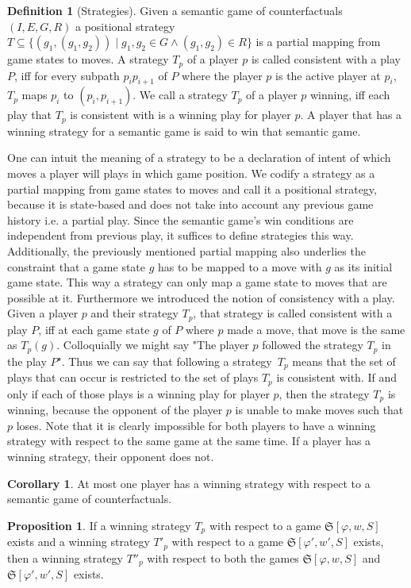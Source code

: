 \documentclass[a4paper,american,10pt]{paper}
\theoremstyle{definition}\newtheorem{lemma}[thm]{Lemma}
\theoremstyle{definition}\newtheorem{proposition}[thm]{Proposition}
\theoremstyle{definition}\newtheorem{corollary}[thm]{Corollary}
\theoremstyle{definition}\newtheorem{definition}{Definition}
\begin{document}
\begin{definition}[Strategies]
Given a semantic game of counterfactuals $(I, E, G, R)$ a positional strategy $T\subseteq\{(g_1,(g_1,g_2))\mid g_1,g_2\in G\wedge (g_1,g_2)\in R\}$ is a partial mapping from game states to moves. A strategy $T_p$ of a player $p$ is called consistent with a play $P$, iff for every subpath $p_ip_{i+1}$ of $P$ where the player $p$ is the active player at $p_i$, $T_p$ maps $p_i$ to $(p_i,p_{i+1})$. We call a strategy $T_p$ of a player $p$ winning, iff each play that $T_p$ is consistent with is a winning play for player $p$. A player that has a winning strategy for a semantic game is said to win that semantic game.
\end{definition}
One can intuit the meaning of a strategy to be a declaration of intent of which moves a player will plays in which game position. We codify a strategy as a partial mapping from game states to moves and call it a positional strategy, because it is state-based and does not take into account any previous game history i.e. a partial play. Since the semantic game's win conditions are independent from previous play, it suffices to define strategies this way. Additionally, the previously mentioned partial mapping also underlies the constraint that a game state $g$ has to be mapped to a move with $g$ as its initial game state. This way a strategy can only map a game state to moves that are possible at it. Furthermore we introduced the notion of consistency with a play. Given a player $p$ and their strategy $T_p$, that strategy is called consistent with a play $P$, iff at each game state $g$ of $P$ where $p$ made a move, that move is the same as $T_p(g)$.
Colloquially we might say "The player $p$ followed the strategy $T_p$ in the play $P$". Thus we can say that following a strategy~$T_p$ means that the set of plays that can occur is restricted to the set of plays $T_p$ is consistent with. If and only if each of those plays is a winning play for player $p$, then the strategy $T_p$ is winning, because the opponent of the player $p$ is unable to make moves such that $p$ loses. Note that it is clearly impossible for both players to have a winning strategy with respect to the same game at the same time. If a player has a winning strategy, their opponent does not.
\begin{corollary}
At most one player has a winning strategy with respect to a semantic game of counterfactuals.
\end{corollary}
\begin{proposition}\label{thm:strategy_combination}
If a winning strategy $T_p$ with respect to a game $\mathfrak{S}[\varphi,w,S]$ exists and a winning strategy $T'_p$ with respect to a game $\mathfrak{S}[\varphi',w',S]$ exists, then a winning strategy $T''_p$ with respect to both the games $\mathfrak{S}[\varphi,w,S]$ and $\mathfrak{S}[\varphi',w',S]$ exists.
\end{proposition}
\end{document}
